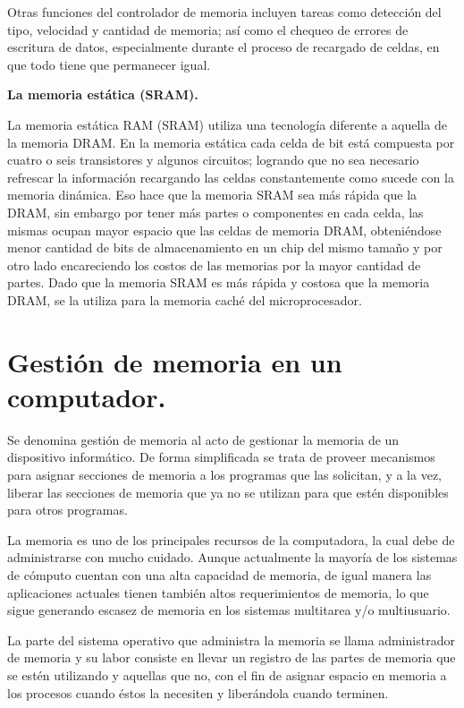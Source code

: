 \documentclass{article}
\begin{document}
Otras funciones del controlador de memoria incluyen tareas como detección del tipo, velocidad
y cantidad de memoria; así como el chequeo de errores de escritura de datos, especialmente
durante el proceso de recargado de celdas, en que todo tiene que permanecer igual.


\textbf{La memoria estática (SRAM).} 

La memoria estática RAM (SRAM) utiliza una tecnología diferente a aquella de la memoria
DRAM. En la memoria estática cada celda de bit está compuesta por cuatro o seis transistores y
algunos circuitos; logrando que no sea necesario refrescar la información recargando las celdas
constantemente como sucede con la memoria dinámica. Eso hace que la memoria SRAM sea
más rápida que la DRAM, sin embargo por tener más partes o componentes en cada celda, las mismas ocupan mayor espacio que las celdas de memoria DRAM, obteniéndose menor cantidad
de bits de almacenamiento en un chip del mismo tamaño y por otro lado encareciendo los costos de las memorias por la mayor cantidad de partes.
Dado que la memoria SRAM es más rápida y costosa que la memoria DRAM, se la utiliza para la memoria caché del microprocesador.
\cite{Desconocido}

\section{Gestión de memoria en un computador.}\label{contenido} 

Se denomina gestión de memoria al acto de gestionar la memoria de un dispositivo informático. De forma simplificada se trata de proveer mecanismos para asignar secciones de memoria a los programas que las solicitan, y a la vez, liberar las secciones de memoria que ya no se utilizan para que estén disponibles para otros programas. 

La memoria es uno de los principales recursos de la computadora, la cual debe de administrarse con mucho cuidado. Aunque actualmente la mayoría de los sistemas de cómputo cuentan con una alta capacidad de memoria, de igual manera las aplicaciones actuales tienen también altos requerimientos de memoria, lo que sigue generando escasez de memoria en los sistemas multitarea y/o multiusuario.

La parte del sistema operativo que administra la memoria se llama administrador de memoria y su labor consiste en llevar un registro de las partes de memoria que se estén utilizando y aquellas que no, con el fin de asignar espacio en memoria a los procesos cuando éstos la necesiten y liberándola cuando terminen.
\end{document}

